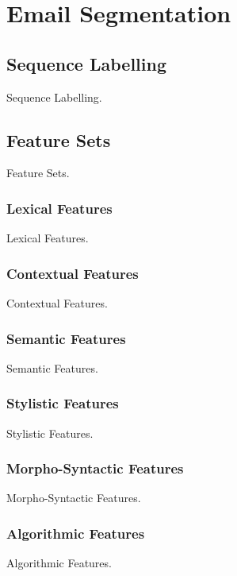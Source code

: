 
\chapter{Email Segmentation}

\section{Sequence Labelling}

Sequence Labelling.

\section{Feature Sets}

Feature Sets.

\subsection{Lexical Features}

Lexical Features.

\subsection{Contextual Features}

Contextual Features.

\subsection{Semantic Features}

Semantic Features.

\subsection{Stylistic Features}

Stylistic Features.

\subsection{Morpho-Syntactic Features}

Morpho-Syntactic Features.

\subsection{Algorithmic Features}

Algorithmic Features.